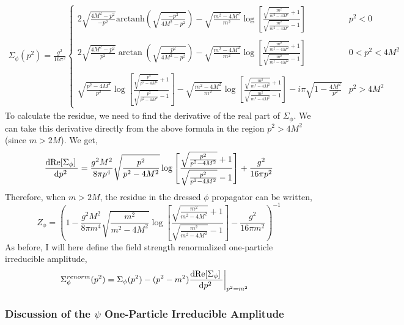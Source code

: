 \documentclass{article}
\begin{document}
\begin{align*}
\Sigma_\phi(p^2) =
\frac{g^2}{16 \pi^2}
\begin{cases}
2 \sqrt{\frac{4 M^2 - p^2}{-p^2}} \mathrm{arctanh}{\left(\sqrt{\frac{-p^2}{4 M^2 - p^2}}\right)} - \sqrt{\frac{m^2 - 4 M^2}{m^2}} \log{\left[ \frac{\sqrt{\frac{m^2}{m^2 - 4 M^2}} + 1}{\sqrt{\frac{m^2}{m^2 - 4 M^2}} - 1} \right]} 
& p^2 < 0
\\
&
\\
2 \sqrt{\frac{4 M^2 - p^2}{p^2}} \arctan{\left( \sqrt{\frac{p^2}{4 M^2 - p^2}} \right)} - \sqrt{\frac{m^2 - 4 M^2}{m^2}} \log{\left[ \frac{\sqrt{\frac{m^2}{m^2 - 4 M^2}} + 1}{\sqrt{\frac{m^2}{m^2 - 4 M^2}} - 1} \right]}
& 0 < p^2 < 4 M^2 
\\
&
\\
\sqrt{\frac{p^2 - 4 M^2}{p^2}} \log{\left[ \frac{\sqrt{\frac{p^2}{p^2 - 4 M^2}} + 1}{\sqrt{\frac{p^2}{p^2 - 4 M^2}} - 1} \right]} 
- \sqrt{\frac{m^2 - 4 M^2}{m^2}} \log{\left[ \frac{\sqrt{\frac{m^2}{m^2 - 4 M^2}} + 1}{\sqrt{\frac{m^2}{m^2 - 4 M^2}} - 1} \right]} - i\pi \sqrt{1 - \frac{4 M^2}{p^2}}
& p^2 > 4 M^2
\end{cases}
\end{align*}
To calculate the residue, we need to find the derivative of the real part of $\Sigma_\phi$. We can take this derivative directly from the above formula in the region $p^2 > 4 M^2$ (since $m > 2 M$). We get,
\[ \frac{\mathrm{d}\mathrm{Re}[\Sigma_\phi] \:}{\mathrm{d}p^2 \:} = \frac{g^2 M^2}{8 \pi p^4} \sqrt{\frac{p^2}{p^2-4 M^2}} \log{\left[\frac{\sqrt{\frac{p^2}{p^2-4
   M^2}}+1}{\sqrt{\frac{p^2}{p^2-4 M^2}}-1}\right]} + \frac{g^2}{16 \pi p^2}  \]
Therefore, when $m > 2 M$, the residue in the dressed $\phi$ propagator can be written,
\[ Z_\phi = \left( 1 - \frac{g^2 M^2}{8 \pi m^4} \sqrt{\frac{m^2}{m^2-4 M^2}} \log{ \left[\frac{\sqrt{\frac{m^2}{m^2-4
   M^2}}+1}{\sqrt{\frac{m^2}{m^2-4 M^2}}-1}\right]} - \frac{g^2}{16 \pi m^2}  \right)^{-1} \]
As before, I will here define the field strength renormalized one-particle irreducible amplitude,
\begin{align*}
\Sigma_\phi^{renorm}(p^2) & = \Sigma_\phi(p^2) - (p^2 - m^2) \frac{\mathrm{d}\mathrm{Re}[\Sigma_\phi] \:}{\mathrm{d}p^2 \:} \bigg|_{p^2 = m^2} 
\end{align*}

\subsubsection{Discussion of the $\psi$ One-Particle Irreducible Amplitude}
\end{document}

